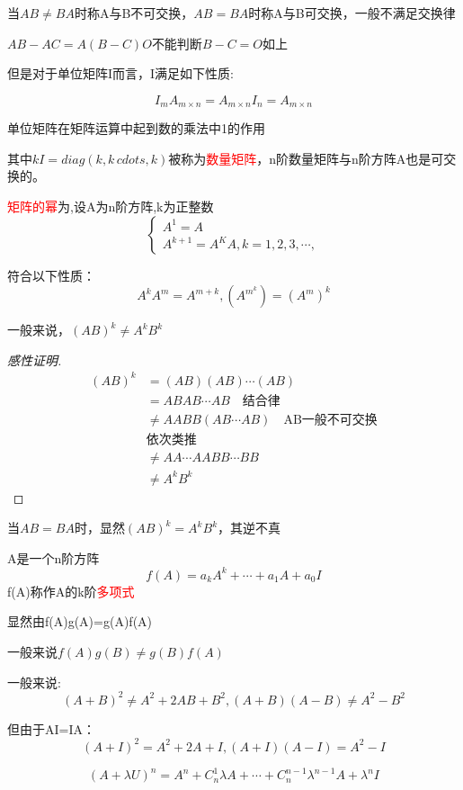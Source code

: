当$AB\neq BA$时称A与B不可交换，$AB=BA$时称A与B可交换，一般不满足交换律

\begin{exclamation}
	$AB-AC=A(B-C)O$不能判断$B-C=O$如上
\end{exclamation}

但是对于单位矩阵I而言，I满足如下性质:

$$
I_{m}A_{m\times n}=A_{m\times n}I_n=A_{m\times n}
$$

单位矩阵在矩阵运算中起到数的乘法中1的作用

其中$kI=diag(k,k\,cdots,k)$被称为\textcolor{red}{数量矩阵}，n阶数量矩阵与n阶方阵A也是可交换的。

\begin{keypoint}
	\textcolor{red}{矩阵的幂}为,设A为n阶方阵,k为正整数
	$$
	\begin{cases}
		A^1=A\\
		A^{k+1}=A^KA,k=1,2,3,\cdots,
	\end{cases}
	$$

	符合以下性质：
	$$
	A^kA^m=A^{m+k},(A^{m^k})=(A^m)^k
	$$
\end{keypoint}

\begin{question}
	一般来说，$(AB)^k\neq A^kB^k$

	\begin{proof}[感性证明]
	$$
	\begin{aligned}
			(AB)^k&=(AB)(AB)\cdots(AB)\\
			&=ABAB\cdots AB\quad \mbox{结合律}\\
			&\neq AABB(AB\cdots AB) \quad \mbox{AB一般不可交换}\\
			&\mbox{依次类推}\\
			&\neq{AA\cdots AABB\cdots BB}\\
			&\neq A^kB^k
	\end{aligned}
	$$
	\end{proof}

	当$AB=BA$时，显然$(AB)^k= A^kB^k$，其逆不真
\end{question}

\begin{information}
	A是一个n阶方阵
	$$
	f(A)=a_kA^k+\cdots+a_1A+a_0I
	$$
	f(A)称作A的k阶\textcolor{red}{多项式}

	显然由f(A)g(A)=g(A)f(A)

	一般来说$f(A)g(B)\neq g(B)f(A)$

	一般来说:
	$$
	(A+B)^2\neq A^2+2AB+B^2
	,(A+B)(A-B)\neq A^2-B^2
	$$

	但由于AI=IA：
	$$
	(A+I)^2= A^2+2A+I
	,(A+I)(A-I)= A^2-I
	$$

	$$(A+\lambda U)^n=A^n+C_n^1\lambda A+\cdots+C_n^{n-1}\lambda^{n-1}A+\lambda^n I$$
\end{information}

